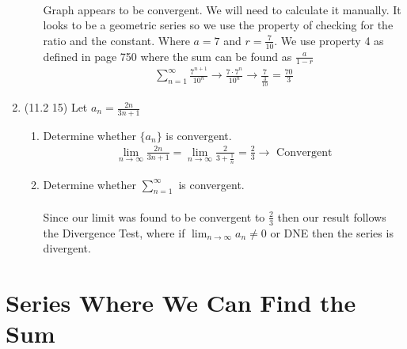 \documentclass[12pt]{article}
\begin{document}
\begin{enumerate}
\begin{enumerate}
\begin{align*}
        \end{align*}
        Graph appears to be convergent. We will need to calculate it manually. It looks to be a geometric series so we use the property of checking for the ratio and the constant. Where $a=7$ and $r=\frac{7}{10}$. We use property 4 as defined in page 750 where the sum can be found as $\frac{a}{1-r}$
        \begin{align*}
            \sum_{n=1}^\infty\frac{7^{n+1}}{10^n} \to \frac{7\cdot7^{n}}{10^n}\to\frac{7}{\frac{3}{10}}=\frac{70}{3}
        \end{align*}
    \end{enumerate}
    \item (11.2 15) Let $a_n = \frac{2n}{3n+1}$
    \begin{enumerate}
        \item Determine whether $\{a_n\}$ is convergent.
        \begin{align}
            \lim_{n\to\infty}\frac{2n}{3n+1}=\lim_{n\to\infty}\frac{2}{3+\frac{1}{n}}=\frac{2}{3}\to\text{ Convergent}
        \end{align}
        \item Determine whether $\sum_{n=1}^\infty$ is convergent.
        \\\\ Since our limit was found to be convergent to $\frac{2}{3}$ then our result follows the Divergence Test, where if $\lim_{n\to\infty}a_n\neq0$ or DNE then the series is divergent.
    \end{enumerate}
\end{enumerate}
\newpage\section{Series Where We Can Find the Sum}
\end{document}
